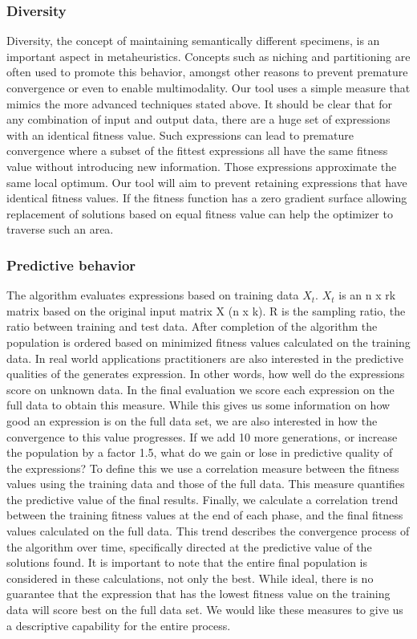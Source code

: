 \subsubsection{Diversity}\label{subsubdiversity}
Diversity, the concept of maintaining semantically different specimens, is an important aspect in metaheuristics. Concepts such as niching and partitioning are often used to promote this behavior, amongst other reasons to prevent premature convergence or even to enable multimodality.
Our tool uses a simple measure that mimics the more advanced techniques stated above. It should be clear that for any combination of input and output data, there are a huge set of expressions with an identical fitness value. Such expressions can lead to premature convergence where a subset of the fittest expressions all have the same fitness value without introducing new information. Those expressions approximate the same local optimum. Our tool will aim to prevent retaining expressions that have identical fitness values.
If the fitness function has a zero gradient surface allowing replacement of solutions based on equal fitness value can help the optimizer to traverse such an area. 

\subsubsection{Predictive behavior}
The algorithm evaluates expressions based on training data $X_t$. $X_t$ is an n x rk matrix based on the original input matrix X (n x k).
R is the sampling ratio, the ratio between training and test data. 
After completion of the algorithm the population is ordered based on minimized fitness values calculated on the training data. 
In real world applications practitioners are also interested in the predictive qualities of the generates expression. In other words, how well do the expressions score on unknown data. In the final evaluation we score each expression on the full data to obtain this measure. 
While this gives us some information on how good an expression is on the full data set, we are also interested in how the convergence to this value progresses. 
If we add 10 more generations, or increase the population by a factor 1.5, what do we gain or lose in predictive quality of the expressions? 
To define this we use a correlation measure between the fitness values using the training data and those of the full data. 
This measure quantifies the predictive value of the final results.
Finally, we calculate a correlation trend between the training fitness values at the end of each phase, and the final fitness values calculated on the full data. This trend describes the convergence process of the algorithm over time, specifically directed at the predictive value of the solutions found. It is important to note that the entire final population is considered in these calculations, not only the best. While ideal, there is no guarantee that the expression that has the lowest fitness value on the training data will score best on the full data set. We would like these measures to give us a descriptive capability for the entire process.

